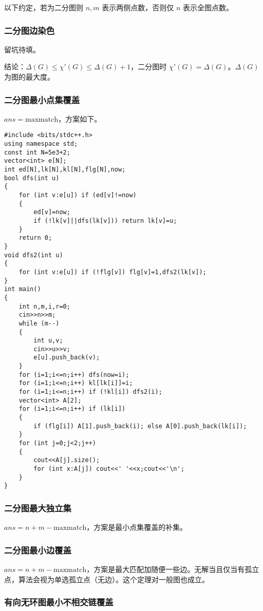 \documentclass[12pt]{ctexart}
\begin{document}
以下约定，若为二分图则 $n,m$ 表示两侧点数，否则仅 $n$ 表示全图点数。

\subsubsection{二分图边染色}

留坑待填。

结论：$\Delta(G)\le \chi'(G) \le \Delta(G)+1$，二分图时 $\chi'(G)=\Delta(G)$。$\Delta(G)$ 为图的最大度。

\subsubsection{二分图最小点集覆盖}

$ans=\text{maxmatch}$，方案如下。

\begin{lstlisting}
#include <bits/stdc++.h>
using namespace std;
const int N=5e3+2;
vector<int> e[N];
int ed[N],lk[N],kl[N],flg[N],now;
bool dfs(int u)
{
	for (int v:e[u]) if (ed[v]!=now)
	{
		ed[v]=now;
		if (!lk[v]||dfs(lk[v])) return lk[v]=u;
	}
	return 0;
}
void dfs2(int u)
{
	for (int v:e[u]) if (!flg[v]) flg[v]=1,dfs2(lk[v]);
}
int main()
{
	int n,m,i,r=0;
	cin>>n>>m;
	while (m--)
	{
		int u,v;
		cin>>u>>v;
		e[u].push_back(v);
	}
	for (i=1;i<=n;i++) dfs(now=i);
	for (i=1;i<=n;i++) kl[lk[i]]=i;
	for (i=1;i<=n;i++) if (!kl[i]) dfs2(i);
	vector<int> A[2];
	for (i=1;i<=n;i++) if (lk[i])
	{
		if (flg[i]) A[1].push_back(i); else A[0].push_back(lk[i]);
	}
	for (int j=0;j<2;j++)
	{
		cout<<A[j].size();
		for (int x:A[j]) cout<<' '<<x;cout<<'\n';
	}
}
\end{lstlisting}

\subsubsection{二分图最大独立集}

$ans=n+m-\text{maxmatch}$，方案是最小点集覆盖的补集。

\subsubsection{二分图最小边覆盖}

$ans=n+m-\text{maxmatch}$，方案是最大匹配加随便一些边。无解当且仅当有孤立点，算法会视为单选孤立点（无边）。这个定理对一般图也成立。

\subsubsection{有向无环图最小不相交链覆盖}
\end{document}

